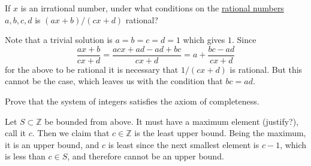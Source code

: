   \begin{exercise}[Olmsted 1.7]
    If $x$ is an irrational number, under what conditions on the \hyperref[alg-def:rational-numbers]{rational numbers} $a, b, c, d$ is $(ax + b)/(cx + d)$ rational? 
  \end{exercise}
  \begin{solution}
    Note that a trivial solution is $a = b = c = d = 1$ which gives $1$. Since 
    \begin{equation}
      \frac{ax + b}{cx + d} = \frac{acx + ad - ad + bc}{cx + d} = a + \frac{bc - ad}{cx + d} 
    \end{equation}
    for the above to be rational it is necessary that $1/(cx + d)$ is rational. But this cannot be the case, which leaves us with the condition that $bc = ad$. 
  \end{solution}

  \begin{exercise}[Olmsted 1.8]
    Prove that the system of integers satisfies the axiom of completeness. 
  \end{exercise}
  \begin{solution}
    Let $S \subset \mathbb{Z}$ be bounded from above. It must have a maximum element (justify?), call it $c$. Then we claim that $c \in \mathbb{Z}$ is the least upper bound. Being the maximum, it is an upper bound, and $c$ is least since the next smallest element is $c-1$, which is less than $c \in S$, and therefore cannot be an upper bound. 
  \end{solution}

